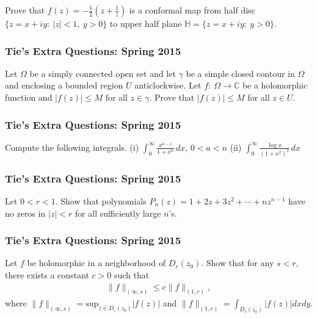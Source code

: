 Prove that
\(\displaystyle{f(z)=-\frac{1}{2}\left(z+\frac{1}{z}\right)}\) is a
conformal map from half disc \(\{z=x+iy:\ |z|<1,\ y>0\}\) to upper half
plane \(\mathbb H=\{z=x+iy:\ y>0\}\).

\hypertarget{ties-extra-questions-spring-2015-29}{%
\subsubsection{Tie's Extra Questions: Spring
2015}\label{ties-extra-questions-spring-2015-29}}

Let \(\Omega\) be a simply connected open set and let \(\gamma\) be a
simple closed contour in \(\Omega\) and enclosing a bounded region \(U\)
anticlockwise. Let \(f: \ \Omega \to {\mathbb C}\) be a holomorphic
function and \(|f(z)|\leq M\) for all \(z\in \gamma\). Prove that
\(|f(z)|\leq M\) for all \(z\in U\).

\hypertarget{ties-extra-questions-spring-2015-30}{%
\subsubsection{Tie's Extra Questions: Spring
2015}\label{ties-extra-questions-spring-2015-30}}

Compute the following integrals. (i)
\(\displaystyle \int_0^\infty \frac{x^{a-1}}{1 + x^n} \, dx\),
\(0< a < n\) (ii)
\(\displaystyle \int_0^\infty \frac{\log x}{(1 + x^2)^2}\, dx\)

\hypertarget{ties-extra-questions-spring-2015-31}{%
\subsubsection{Tie's Extra Questions: Spring
2015}\label{ties-extra-questions-spring-2015-31}}

Let \(0<r<1\). Show that polynomials
\(P_n(z) = 1 + 2z + 3 z^2 + \cdots + n z^{n-1}\) have no zeros in
\(|z|<r\) for all sufficiently large \(n\)'s.

\hypertarget{ties-extra-questions-spring-2015-32}{%
\subsubsection{Tie's Extra Questions: Spring
2015}\label{ties-extra-questions-spring-2015-32}}

Let \(f\) be holomorphic in a neighborhood of \(D_r(z_0)\). Show that
for any \(s<r\), there exists a constant \(c>0\) such that
\begin{align*}\|f\|_{(\infty, s)} \leq c \|f\|_{(1, r)},\end{align*}
where
\(\displaystyle \|f\|_{(\infty, s)} = \text{sup}_{z \in D_s(z_0)}|f(z)|\)
and \(\displaystyle \|f\|_{(1, r)} = \int_{D_r(z_0)} |f(z)|dx dy\).

